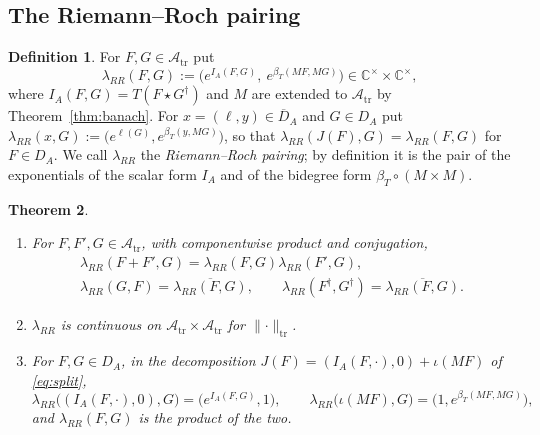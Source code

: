 \documentclass[11pt]{amsart}
\newtheorem{theorem}{Theorem}[section]
\theoremstyle{definition}
\newtheorem{definition}[theorem]{Definition}
\theoremstyle{remark}
\newcommand{\C}{\mathbb C}
\newcommand{\DA}{D_A}
\newcommand{\NAd}{\overline{D}_A}
\begin{document}
\subsection{The Riemann--Roch pairing}\label{sec:RR}

\begin{definition}\label{def:RR}
For $F,G\in\mathcal A_{\mathrm{tr}}$ put
\begin{equation}\label{eq:lRR}
\lambda_{RR}(F,G):=\bigl(e^{I_A(F,G)},\ e^{\beta_T(MF,MG)}\bigr)
\in\C^{\times}\times\C^{\times},
\end{equation}
where $I_A(F,G)=T(F\star G^{\dagger})$ and $M$ are extended to $\mathcal A_{\mathrm{tr}}$ by
Theorem~\ref{thm:banach}.  For $x=(\ell,y)\in\NAd$ and $G\in\DA$ put
$\lambda_{RR}(x,G):=\bigl(e^{\ell(G)},e^{\beta_T(y,MG)}\bigr)$, so that
$\lambda_{RR}(J(F),G)=\lambda_{RR}(F,G)$ for $F\in\DA$.  We call
$\lambda_{RR}$ the \emph{Riemann--Roch pairing}; by definition it is the pair
of the exponentials of the scalar form $I_A$ and of the bidegree form
$\beta_T\circ(M\times M)$.
\end{definition}

\begin{theorem}\label{thm:RR}
\begin{enumerate}
\item[(a)] For $F,F',G\in\mathcal A_{\mathrm{tr}}$, with componentwise product and conjugation,
\begin{gather*}
\lambda_{RR}(F+F',G)=\lambda_{RR}(F,G)\lambda_{RR}(F',G),\\
\lambda_{RR}(G,F)=\overline{\lambda_{RR}(F,G)},\qquad
\lambda_{RR}(F^{\dagger},G^{\dagger})=\overline{\lambda_{RR}(F,G)}.
\end{gather*}
\item[(b)] $\lambda_{RR}$ is continuous on $\mathcal A_{\mathrm{tr}}\times\mathcal A_{\mathrm{tr}}$ for
$\lVert\cdot\rVert_{\mathrm{tr}}$.
\item[(c)] For $F,G\in\DA$, in the decomposition
$J(F)=(I_A(F,\cdot),0)+\iota(MF)$ of \eqref{eq:split},
\begin{equation}\label{eq:weilformula}
\lambda_{RR}\bigl((I_A(F,\cdot),0),G\bigr)=\bigl(e^{I_A(F,G)},1\bigr),\qquad
\lambda_{RR}\bigl(\iota(MF),G\bigr)=\bigl(1,e^{\beta_T(MF,MG)}\bigr),
\end{equation}
and $\lambda_{RR}(F,G)$ is the product of the two.
\end{enumerate}
\end{theorem}
\end{document}
